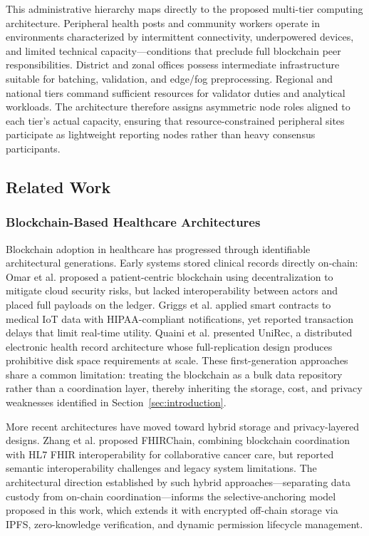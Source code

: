 \documentclass[AMA,LATO1COL]{WileyNJD-v2}
\begin{document}
This administrative hierarchy maps directly to the proposed multi-tier computing architecture. Peripheral health posts and community workers operate in environments characterized by intermittent connectivity, underpowered devices, and limited technical capacity---conditions that preclude full blockchain peer responsibilities. District and zonal offices possess intermediate infrastructure suitable for batching, validation, and edge/fog preprocessing. Regional and national tiers command sufficient resources for validator duties and analytical workloads. The architecture therefore assigns asymmetric node roles aligned to each tier's actual capacity, ensuring that resource-constrained peripheral sites participate as lightweight reporting nodes rather than heavy consensus participants.

\subsection{Related Work}\label{subsec:related}

\subsubsection{Blockchain-Based Healthcare Architectures}

Blockchain adoption in healthcare has progressed through identifiable architectural generations. Early systems stored clinical records directly on-chain: Omar et al.\cite{omar2019privacy} proposed a patient-centric blockchain using decentralization to mitigate cloud security risks, but lacked interoperability between actors and placed full payloads on the ledger. Griggs et al.\cite{griggs2018healthcare} applied smart contracts to medical IoT data with HIPAA-compliant notifications, yet reported transaction delays that limit real-time utility. Quaini et al.\cite{quaini2018model} presented UniRec, a distributed electronic health record architecture whose full-replication design produces prohibitive disk space requirements at scale. These first-generation approaches share a common limitation: treating the blockchain as a bulk data repository rather than a coordination layer, thereby inheriting the storage, cost, and privacy weaknesses identified in Section~\ref{sec:introduction}.

More recent architectures have moved toward hybrid storage and privacy-layered designs. Zhang et al.\cite{zhang2018fhirchain} proposed FHIRChain, combining blockchain coordination with HL7 FHIR interoperability for collaborative cancer care, but reported semantic interoperability challenges and legacy system limitations. The architectural direction established by such hybrid approaches---separating data custody from on-chain coordination---informs the selective-anchoring model proposed in this work, which extends it with encrypted off-chain storage via IPFS, zero-knowledge verification, and dynamic permission lifecycle management.
\end{document}
